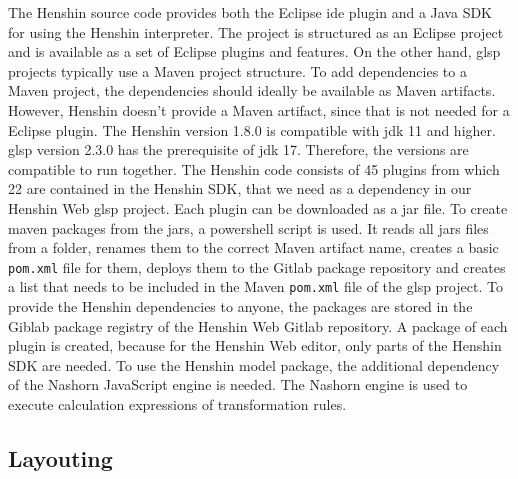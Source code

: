 \documentclass[conference,onecolumn]{IEEEtran}
\newcommand{\code}[1]{\texttt{#1}}
\begin{document}
  The Henshin source code provides both the Eclipse \ac{ide} plugin and a Java SDK for using the Henshin interpreter. The project is structured as an Eclipse project and is available as a set of Eclipse plugins and features. \cite{henshin-repo} On the other hand, \ac{glsp} projects typically use a Maven project structure. \cite{glsp-repo} To add dependencies to a Maven project, the dependencies should ideally be available as Maven artifacts. However, Henshin doesn't provide a Maven artifact, since that is not needed for a Eclipse plugin. The Henshin version 1.8.0 is compatible with \acs{jdk} 11 and higher. \ac{glsp} version 2.3.0 has the prerequisite of \acs{jdk} 17. Therefore, the versions are compatible to run together. The Henshin code consists of 45 plugins from which 22 are contained in the Henshin SDK, that we need as a dependency in our Henshin Web \ac{glsp} project. Each plugin can be downloaded as a \acs{jar} file. To create maven packages from the \acsp{jar}, a powershell script is used. It reads all \acsp{jar} files from a folder, renames them to the correct Maven artifact name, creates a basic \code{pom.xml} file for them, deploys them to the Gitlab package repository and creates a list that needs to be included in the Maven \code{pom.xml} file of the \ac{glsp} project. To provide the Henshin dependencies to anyone, the packages are stored in the Giblab package registry of the Henshin Web Gitlab repository. A package of each plugin is created, because for the Henshin Web editor, only parts of the Henshin SDK are needed. To use the Henshin model package, the additional dependency of the Nashorn JavaScript engine \cite{nashorn-repo} is needed. The Nashorn engine is used to execute calculation expressions of transformation rules. \cite{henshin}

  \subsection{Layouting}
  \label{subsec:layouting}
\end{document}
